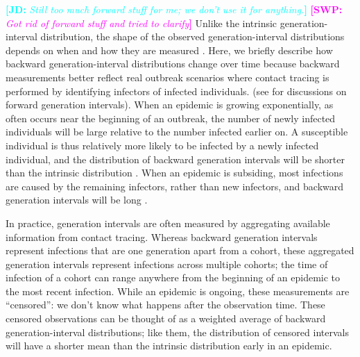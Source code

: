 \documentclass[12pt]{article}
\newcommand{\comment}[3]{\textcolor{#1}{\textbf{[#2: }\textsl{#3}\textbf{]}}}
\newcommand{\jd}[1]{\comment{cyan}{JD}{#1}}
\newcommand{\swp}[1]{\comment{magenta}{SWP}{#1}}
\begin{document}
\jd{Still too much forward stuff for me; we don't use it for anything.}
\swp{Got rid of forward stuff and tried to clarify}
Unlike the intrinsic generation-interval distribution, the shape of the observed generation-interval distributions depends on when and how they are measured \citep{kenah2008generation, nishiura2010time, tomba2010some, champredon2015intrinsic, britton2019estimation}. 
Here, we briefly describe how backward generation-interval distributions change over time because backward measurements better reflect real outbreak scenarios where contact tracing is performed by identifying infectors of infected individuals. (see \cite{kenah2008generation, nishiura2010time, tomba2010some, champredon2015intrinsic} for discussions on forward generation intervals).
When an epidemic is growing exponentially, as often occurs near the beginning of an outbreak, the number of newly infected individuals will be large relative to the number infected earlier on. 
A susceptible individual is thus relatively more likely to be infected by a newly infected individual, 
and the distribution of backward generation intervals will be shorter than the intrinsic distribution \citep{nishiura2010time, champredon2015intrinsic, britton2019estimation}.
When an epidemic is subsiding, most infections are caused by the remaining infectors, rather than new infectors, and backward generation intervals will be long \citep{nishiura2010time, tomba2010some, champredon2015intrinsic}.

In practice, generation intervals are often measured by aggregating available information from contact tracing. 
Whereas backward generation intervals represent infections that are one generation apart from a cohort, these aggregated generation intervals represent infections across multiple cohorts; 
the time of infection of a cohort can range anywhere from the beginning of an epidemic to the most recent infection.
While an epidemic is ongoing, these measurements are ``censored'': we don't know what happens after the observation time.
These censored observations can be thought of as a weighted average of backward generation-interval distributions;
like them, the distribution of censored intervals will have a shorter mean than the intrinsic distribution early in an epidemic.
\end{document}
